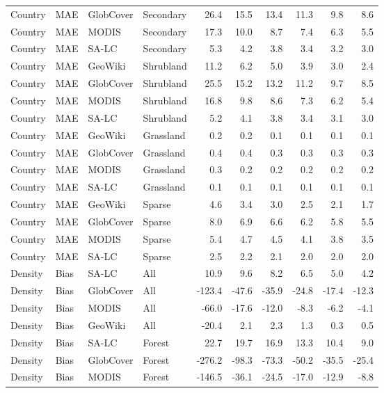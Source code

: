 \begin{longtable}{llllrrrrrr}
  Country & MAE & GlobCover & Secondary & 26.4 & 15.5 & 13.4 & 11.3 & 9.8 & 8.6 \\ 
  Country & MAE & MODIS & Secondary & 17.3 & 10.0 & 8.7 & 7.4 & 6.3 & 5.5 \\ 
  Country & MAE & SA-LC & Secondary & 5.3 & 4.2 & 3.8 & 3.4 & 3.2 & 3.0 \\ 
  Country & MAE & GeoWiki & Shrubland & 11.2 & 6.2 & 5.0 & 3.9 & 3.0 & 2.4 \\ 
  Country & MAE & GlobCover & Shrubland & 25.5 & 15.2 & 13.2 & 11.2 & 9.7 & 8.5 \\ 
  Country & MAE & MODIS & Shrubland & 16.8 & 9.8 & 8.6 & 7.3 & 6.2 & 5.4 \\ 
  Country & MAE & SA-LC & Shrubland & 5.2 & 4.1 & 3.8 & 3.4 & 3.1 & 3.0 \\ 
  Country & MAE & GeoWiki & Grassland & 0.2 & 0.2 & 0.1 & 0.1 & 0.1 & 0.1 \\ 
  Country & MAE & GlobCover & Grassland & 0.4 & 0.4 & 0.3 & 0.3 & 0.3 & 0.3 \\ 
  Country & MAE & MODIS & Grassland & 0.3 & 0.2 & 0.2 & 0.2 & 0.2 & 0.2 \\ 
  Country & MAE & SA-LC & Grassland & 0.1 & 0.1 & 0.1 & 0.1 & 0.1 & 0.1 \\ 
  Country & MAE & GeoWiki & Sparse & 4.6 & 3.4 & 3.0 & 2.5 & 2.1 & 1.7 \\ 
  Country & MAE & GlobCover & Sparse & 8.0 & 6.9 & 6.6 & 6.2 & 5.8 & 5.5 \\ 
  Country & MAE & MODIS & Sparse & 5.4 & 4.7 & 4.5 & 4.1 & 3.8 & 3.5 \\ 
  Country & MAE & SA-LC & Sparse & 2.5 & 2.2 & 2.1 & 2.0 & 2.0 & 2.0 \\ 
  Density & Bias & SA-LC & All & 10.9 & 9.6 & 8.2 & 6.5 & 5.0 & 4.2 \\ 
  Density & Bias & GlobCover & All & -123.4 & -47.6 & -35.9 & -24.8 & -17.4 & -12.3 \\ 
  Density & Bias & MODIS & All & -66.0 & -17.6 & -12.0 & -8.3 & -6.2 & -4.1 \\ 
  Density & Bias & GeoWiki & All & -20.4 & 2.1 & 2.3 & 1.3 & 0.3 & 0.5 \\ 
  Density & Bias & SA-LC & Forest & 22.7 & 19.7 & 16.9 & 13.3 & 10.4 & 9.0 \\ 
  Density & Bias & GlobCover & Forest & -276.2 & -98.3 & -73.3 & -50.2 & -35.5 & -25.4 \\ 
  Density & Bias & MODIS & Forest & -146.5 & -36.1 & -24.5 & -17.0 & -12.9 & -8.8 \\ 

\end{longtable}
